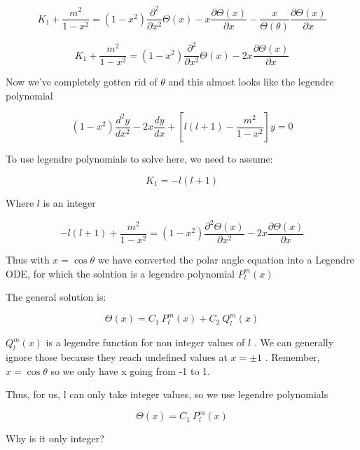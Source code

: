 \documentclass[12pt]{article}
\renewcommand{\_}{\kern-1.5pt\textunderscore\kern-1.5pt}
\begin{document}
 \[ K_{1}+\frac{m^{2}}{1-x^{2}}= \left( 1-x^{2} \right) \frac{ \partial ^{2}}{ \partial x^{2}} \Theta  \left( x \right) -x\frac{ \partial  \Theta  \left( x \right) }{ \partial x}-\frac{x}{ \Theta  \left(  \theta  \right) }\frac{ \partial  \Theta  \left( x \right) }{ \partial x} \] \par

 \[ K_{1}+\frac{m^{2}}{1-x^{2}}= \left( 1-x^{2} \right) \frac{ \partial ^{2}}{ \partial x^{2}} \Theta  \left( x \right) -2x\frac{ \partial  \Theta  \left( x \right) }{ \partial x} \] \par


\vspace{\baselineskip}
Now we’ve completely gotten rid of  \(  \theta  \)  and this almost looks like the legendre polynomial\par

 \[  \left( 1-x^{2} \right) \frac{d^{2}y}{dx^{2}}-2x\frac{dy}{dx}+ \left[ l \left( l+1 \right) -\frac{m^{2}}{1-x^{2}} \right] y=0 \] \par

To use legendre polynomials to solve here, we need to assume:\par

 \[ K_{1}=-l \left( l+1 \right)  \] \par

Where  \( l \)  is an integer\par

 \[ -l \left( l+1 \right) +\frac{m^{2}}{1-x^{2}}= \left( 1-x^{2} \right) \frac{ \partial ^{2} \Theta  \left( x \right) }{ \partial x^{2}}-2x\frac{ \partial  \Theta  \left( x \right) }{ \partial x} \] \par

Thus with  \( x=\cos  \theta  \)  we have converted the polar angle equation into a Legendre ODE, for which the solution is a legendre polynomial  \( P_{l}^{m} \left( x \right)  \) \par

The general solution is:\par

 \[  \Theta  \left( x \right) =C_{1}~P_{l}^{m} \left( x \right) +C_{2}~Q_{l}^{m} \left( x \right)  \] \par

 \( Q_{l}^{m} \left( x \right)  \)  is a legendre function for non integer values of  \( l \) . We can generally ignore those because they reach undefined values at  \( x= \pm 1 \) . Remember,  \( x=\cos  \theta  \)  so we only have x going from -1 to 1. \par

Thus, for us, l can only take integer values, so we use legendre polynomials \par

 \[  \Theta  \left( x \right) =C_{1}~P_{l}^{m} \left( x \right)  \] \par

Why is it only integer?\par


\printbibliography
\end{document}
